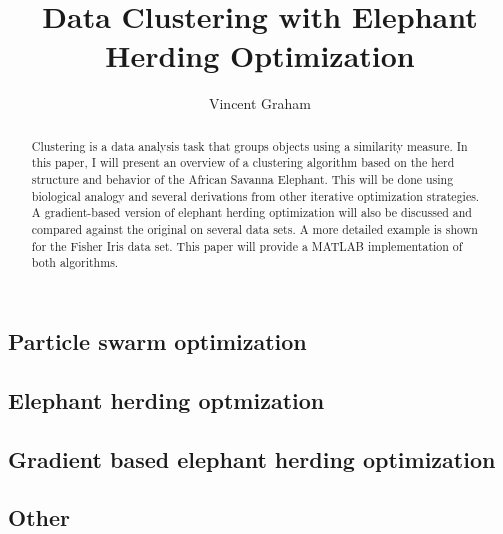 \documentclass[journal, onecolumn, 12p]{IEEEtran}
\date{}
\newcounter{alg}[section] %
\begin{document}
\author{Vincent Graham}
\title{Data Clustering with Elephant Herding Optimization}
\maketitle
\thispagestyle{plain}

\begin{abstract}
Clustering is a data analysis task that groups objects using a similarity measure. In this paper, I will present an overview of a clustering algorithm based on the herd structure and behavior of the African Savanna Elephant. This will be done using biological analogy and several derivations from other iterative optimization strategies. A gradient-based version of elephant herding optimization will also be discussed and compared against the original on several data sets. A more detailed example is shown for the Fisher Iris data set. This paper will provide a MATLAB implementation of both algorithms.
\end{abstract}

% 





\nocite{*}
\clearpage



\newpage
\clearpage

\appendix
\subsection{Particle swarm optimization}

\clearpage

\clearpage
\subsection{Elephant herding optmization}

\clearpage
\subsection{Gradient based elephant herding optimization}

\clearpage

\clearpage
\subsection{Other}

\clearpage
\end{document}
